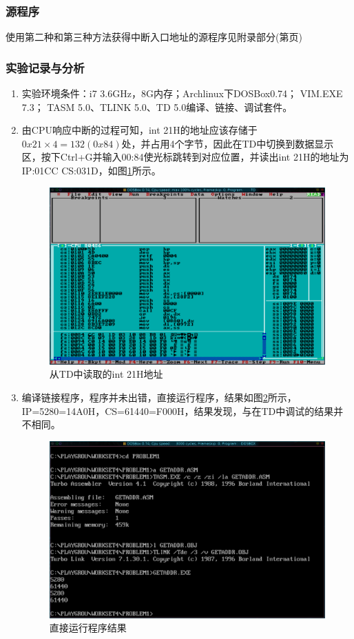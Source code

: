 \documentclass{article}
\begin{document}
	\subsubsection{源程序}
	使用第二种和第三种方法获得中断入口地址的源程序见附录部分(第\pageref{code:4_1}页)

	\subsubsection{实验记录与分析}
	\begin{enumerate}
		\item 实验环境条件：i7 3.6GHz，8G内存；Archlinux下DOSBox0.74； VIM.EXE 7.3； TASM 5.0、TLINK 5.0、TD 5.0编译、链接、调试套件。
		\item 由CPU响应中断的过程可知，int 21H的地址应该存储于$0x21\times4=132(0x84)$处，并占用4个字节，因此在TD中切换到数据显示区，按下Ctrl+G并输入00:84使光标跳转到对应位置，并读出int 21H的地址为IP:01CC CS:031D，如图\ref{fig:int21address}所示。
			\begin{figure}[H]
				\centering
				\includegraphics[width=0.9\linewidth]{res/homework_4/int21address.png}
				\caption{从TD中读取的int 21H地址}
				\label{fig:int21address}
			\end{figure}

		\item 编译链接程序，程序并未出错，直接运行程序，结果如图\ref{fig:runprog}所示，IP=5280=14A0H，CS=61440=F000H，结果发现，与在TD中调试的结果并不相同。
			\begin{figure}[H]
				\centering
				\includegraphics[width=0.9\linewidth]{res/homework_4/runprog.png}
				\caption{直接运行程序结果}
				\label{fig:runprog}
			\end{figure}


\end{enumerate}
\end{document}
